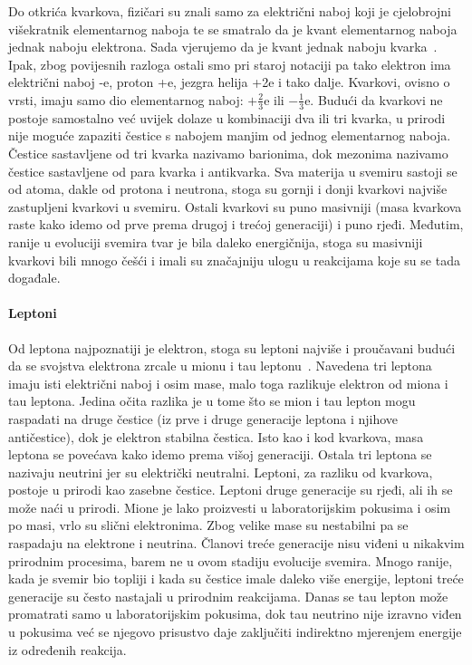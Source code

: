 \documentclass[12pt,a4paper,oneside]{article}
\begin{document}
\begin{linenumbers}
		Do otkrića kvarkova, fizičari su znali samo za električni naboj koji je cjelobrojni višekratnik elementarnog naboja te se smatralo da je kvant elementarnog naboja jednak naboju elektrona. Sada vjerujemo da je kvant  jednak naboju kvarka~\cite{uvod2}. Ipak, zbog povijesnih razloga ostali smo pri staroj notaciji pa tako elektron ima električni naboj -e, proton +e, jezgra helija +2e i tako dalje. Kvarkovi, ovisno o vrsti, imaju samo dio elementarnog naboj: $+\frac{2}{3}$e ili $-\frac{1}{3}$e. Budući da kvarkovi ne postoje samostalno već uvijek dolaze u kombinaciji dva ili tri kvarka, u prirodi nije moguće zapaziti čestice s nabojem manjim od jednog elementarnog naboja. Čestice sastavljene od tri kvarka nazivamo barionima, dok mezonima nazivamo čestice sastavljene od para kvarka i antikvarka. Sva materija u svemiru sastoji se od atoma, dakle od protona i neutrona, stoga su gornji i donji kvarkovi najviše zastupljeni kvarkovi u svemiru. Ostali kvarkovi su puno masivniji (masa kvarkova raste kako idemo od prve prema drugoj i trećoj generaciji) i puno rjeđi. Međutim, ranije u evoluciji svemira tvar je bila daleko energičnija, stoga su masivniji kvarkovi bili mnogo češći i imali su značajniju ulogu u reakcijama koje su se tada događale.
		
		\paragraph{Leptoni\newline}
		Od leptona najpoznatiji je elektron, stoga su leptoni najviše i proučavani budući da se svojstva elektrona zrcale u mionu i tau leptonu~\cite{uvod2}. Navedena tri leptona imaju isti električni naboj i osim mase, malo toga razlikuje elektron od miona i tau leptona. Jedina očita razlika je u tome što se mion i tau lepton mogu raspadati na druge čestice (iz prve i druge generacije leptona i njihove antičestice), dok je elektron stabilna čestica. Isto kao i kod kvarkova, masa leptona se povećava kako idemo prema višoj generaciji.
		Ostala tri leptona se nazivaju neutrini jer su električki neutralni.
		Leptoni, za razliku od kvarkova, postoje u prirodi kao zasebne čestice. 
		Leptoni druge generacije su rjeđi, ali ih se može naći u prirodi. Mione je lako proizvesti u laboratorijskim pokusima i osim po masi, vrlo su slični elektronima. Zbog velike mase su nestabilni pa se raspadaju na elektrone i neutrina. Članovi treće generacije nisu viđeni u nikakvim prirodnim procesima, barem ne u ovom stadiju evolucije svemira. Mnogo ranije, kada je svemir bio topliji i kada su čestice imale daleko više energije, leptoni treće generacije su često nastajali u prirodnim reakcijama. Danas se tau lepton može promatrati samo u laboratorijskim pokusima, dok tau neutrino nije izravno viđen u pokusima već se njegovo prisustvo daje zaključiti indirektno mjerenjem energije iz određenih reakcija.
		

\end{linenumbers}
\end{document}
